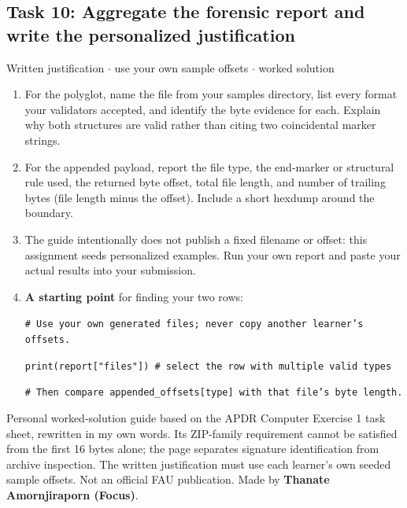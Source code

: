 \documentclass[11pt]{article}
\begin{document}
\begin{keepsection}\subsection{Task 10: Aggregate the forensic report and write the personalized justification}

\begin{workedbox}{Written justification \ensuremath{\cdot} use your own sample offsets \ensuremath{\cdot} worked solution}
\begin{enumerate}
\item For the polyglot, name the file from your samples directory, list every format your validators accepted, and identify the byte evidence for each. Explain why both structures are valid rather than citing two coincidental marker strings.
\item For the appended payload, report the file type, the end-marker or structural rule used, the returned byte offset, total file length, and number of trailing bytes (file length minus the offset). Include a short hexdump around the boundary.
\item The guide intentionally does not publish a fixed filename or offset: this assignment seeds personalized examples. Run your own report and paste your actual results into your submission.
\item {}
\textbf{A starting point} for finding your two rows:
\begin{tcolorbox}[colback=Paperblue,colframe=Paperblue,boxrule=0pt,arc=0pt,left=7pt,right=7pt,top=5pt,bottom=5pt]\small\sloppy
\noindent\hspace*{0em}\texttt{\# Use your own generated files; never copy another learner's offsets.}\par
\noindent\hspace*{0em}\texttt{print(report["files"]) \# select the row with multiple valid types}\par
\noindent\hspace*{0em}\texttt{\# Then compare appended\_offsets[type] with that file's byte length.}\par
\end{tcolorbox}
\end{enumerate}
\end{workedbox}

\end{keepsection}

\vfill{\small Personal worked-solution guide based on the APDR Computer Exercise 1 task sheet, rewritten in my own words. Its ZIP-family requirement cannot be satisfied from the first 16 bytes alone; the page separates signature identification from archive inspection. The written justification must use each learner’s own seeded sample offsets. Not an official FAU publication. Made by \textbf{Thanate Amornjiraporn (Focus)}.}
\end{document}
